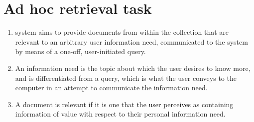 \section{Ad hoc retrieval task}\label{ad hoc retrieval task}
\begin{enumerate}
    \item system aims to provide documents from within the collection that are relevant to an arbitrary user information need, communicated to the system by means of a one-off, user-initiated query. 
    
    \item An information need is the topic about which the user desires to know more, and is differentiated from a query, which is what the user conveys to the computer in an attempt to communicate the information need.

    \item A document is relevant if it is one that the user perceives as containing information of value with respect to their personal information need.
\end{enumerate}








































